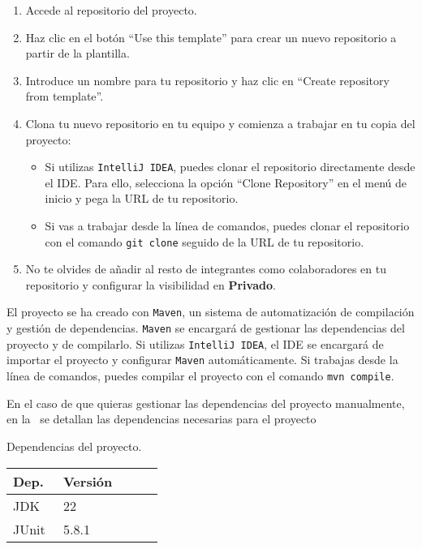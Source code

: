 \documentclass[
    a4paper, %
    12pt, %
]{CSSullivanBusinessReport}
\begin{document}
\begin{enumerate}
    \item Accede al repositorio del proyecto.
    \item Haz clic en el botón ``Use this template'' para crear un nuevo repositorio a partir de la plantilla.
    \item Introduce un nombre para tu repositorio y haz clic en ``Create repository from template''.
    \item Clona tu nuevo repositorio en tu equipo y comienza a trabajar en tu copia del proyecto:
    \begin{itemize}
        \item Si utilizas \texttt{IntelliJ IDEA}, puedes clonar el repositorio directamente desde el IDE. Para ello, selecciona la opción ``Clone Repository'' en el menú de inicio y pega la URL de tu repositorio.
        \item Si vas a trabajar desde la línea de comandos, puedes clonar el repositorio con el comando \texttt{git clone} seguido de la URL de tu repositorio.
    \end{itemize}
    \item No te olvides de añadir al resto de integrantes como colaboradores en tu repositorio y configurar la visibilidad en \textbf{Privado}.
\end{enumerate}

El proyecto se ha creado con \texttt{Maven}, un sistema de automatización de compilación y gestión de dependencias. \texttt{Maven} se encargará de gestionar las dependencias del proyecto y de compilarlo. Si utilizas \texttt{IntelliJ IDEA}, el IDE se encargará de importar el proyecto y configurar \texttt{Maven} automáticamente. Si trabajas desde la línea de comandos, puedes compilar el proyecto con el comando \texttt{mvn compile}. 

En el caso de que quieras gestionar las dependencias del proyecto manualmente, en la~ se detallan las dependencias necesarias para el proyecto

\begin{margintable}
    \footnotesize
    \caption{Dependencias del proyecto.}\label{tab:dependencias-proyecto}
    \begin{tabular}{L{0.3\linewidth} L{0.6\linewidth}}
        \toprule
        \textbf{Dep.} & \textbf{Versión} \\
        \midrule
        JDK & 22\\
        JUnit & 5.8.1\\
        \bottomrule
    \end{tabular}
\end{margintable}
\end{document}

